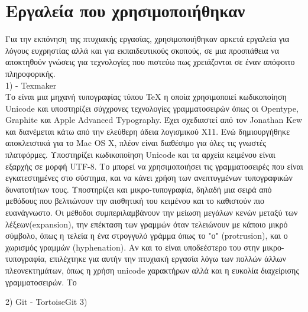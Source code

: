 \section{Εργαλεία που χρησιμοποιήθηκαν}

Για την εκπόνηση της πτυχιακής εργασίας, χρησιμοποιήθηκαν αρκετά εργαλεία για λόγους ευχρηστίας αλλά και για εκπαιδευτικούς σκοπούς, σε μια προσπάθεια να αποκτηθούν γνώσεις για τεχνολογίες που πιστεύω πως χρειάζονται σε έναν απόφοιτο πληροφορικής.\\
1)  - Texmaker\\
Το  είναι μια μηχανή τυπογραφίας τύπου TeX η οποία χρησιμοποιεί κωδικοποίηση Unicode και υποστηρίζει σύγχρονες τεχνολογίες γραμματοσειρών όπως οι Opentype, Graphite και Apple Advanced Typography. Έχει σχεδιαστεί από τον Jonathan Kew και διανέμεται κάτω από την ελεύθερη άδεια λογισμικού X11. Ενώ δημιουργήθηκε αποκλειστικά για το Mac OS X, πλέον είναι διαθέσιμο για όλες τις γνωστές πλατφόρμες. Υποστηρίζει κωδικοποίηση Unicode και τα αρχεία κειμένου είναι εξαρχής σε μορφή UTF-8. Το  μπορεί να χρησιμοποιήσει τις γραμματοσειρές που είναι εγκατεστημένες στο σύστημα, και να κάνει χρήση των ανεπτυγμένων τυπογραφικών δυνατοτήτων τους. Υποστηρίζει και μικρο-τυπογραφία, δηλαδή μια σειρά από μεθόδους που βελτιώνουν την αισθητική του κειμένου και το καθιστούν πιο ευανάγνωστο. Οι μέθοδοι συμπεριλαμβάνουν την μείωση μεγάλων κενών μεταξύ των λέξεων(expansion), την επέκταση των γραμμών όταν τελειώνουν με κάποιο μικρό σύμβολο, όπως η τελεία η ένα στρογγυλό γράμμα όπως το "ο" (protrusion), και ο χωρισμός γραμμών (hyphenation). Αν και το  είναι υποδεέστερο του  στην μικρο-τυπογραφία, επιλέχτηκε για αυτήν την πτυχιακή εργασία λόγω των πολλών άλλων πλεονεκτημάτων, όπως η χρήση unicode χαρακτήρων αλλά και η ευκολία διαχείρισης γραμματοσειρών. Το  

2) Git - TortoiseGit
3) 